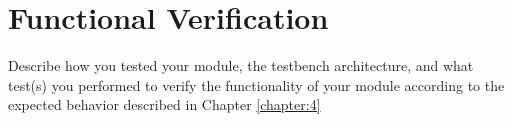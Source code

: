 \chapter{Functional Verification}\label{chapter:5}
Describe how you tested your module, the testbench architecture, and what test(s) you performed to verify the functionality of your module according to the expected behavior described in Chapter \ref{chapter:4}